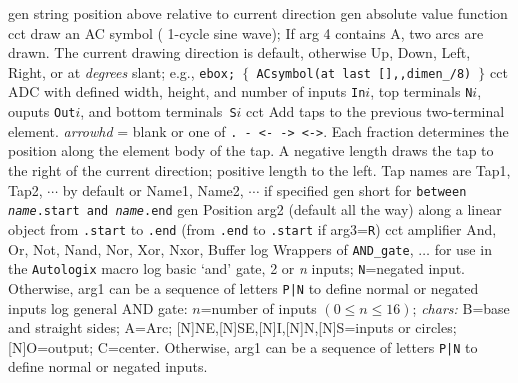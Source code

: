 \vspace{\abovedisplayskip}
\noindent
{}
  {gen}
  {string position above relative to current direction}
  {gen}
  {absolute value function}
  {cct}
  {draw an AC symbol ( 1-cycle sine wave); If arg 4 contains A, two arcs
   are drawn.  The current drawing direction is default, otherwise Up, Down,
   Left, Right, or at {\sl degrees} slant; e.g., 
   {\tt ebox; $\lbrace$ ACsymbol(at last [],{,}dimen\_/8) $\rbrace$} }
  {cct}
  {ADC with defined width, height, and number of inputs {\tt In$i$},
    top terminals {\tt N$i$}, ouputs {\tt Out$i$},
    and bottom terminals~{\tt S$i$}}
  {cct}
  {Add taps to the previous two-terminal element.
   {\sl arrowhd} = blank or one of {\tt . - <- -> <->}.
   Each fraction determines the position along the element body of the tap.
   A negative length draws the tap to the right of the current
   direction; positive length to the left.
   Tap names are Tap1, Tap2, $\cdots$ by default  or
   Name1, Name2, $\cdots$ if specified 
   }
  {gen}
  {short for {\tt between {\sl name}.start and {\sl name}.end}}
  {gen}
  {Position arg2 (default all the way) along a linear object
   from {\tt .start} to {\tt .end}
   (from {\tt .end} to {\tt .start} if arg3={\tt R}) }
  {cct}
  {amplifier}
%
 {And, Or, Not, Nand, Nor, Xor, Nxor, Buffer}{}
  {log}
  {Wrappers of {\tt AND\_gate}, $\ldots$ for use in the {\tt Autologix}
   macro}
  {log}
  {basic `and' gate, 2 or {\sl n\/} inputs; {\tt N}=negated input.
   Otherwise, arg1 can be a sequence of letters {\tt P|N}
   to define normal or negated inputs
    }
  {log}
  {general AND gate: $n$=number of inputs $(0\leq n\leq 16)$;
           {\sl chars:}
           B=base and straight sides; A=Arc;
           [N]NE,[N]SE,[N]I,[N]N,[N]S=inputs or circles;
           [N]O=output; C=center.
   Otherwise, arg1 can be a sequence of letters {\tt P|N}
   to define normal or negated inputs.}
